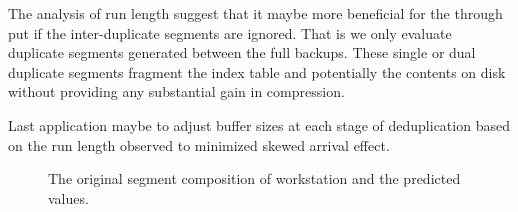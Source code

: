 The analysis of run length suggest that it maybe more beneficial for the through put if the inter-duplicate segments are ignored. That is we only evaluate duplicate segments generated between the full backups. These single or dual duplicate segments fragment the index table and potentially the contents on disk without providing any substantial gain in compression. 

Last application maybe to adjust buffer sizes at each stage of deduplication based on the run length observed to minimized skewed arrival effect. 

 \begin{figure}[!t]
\centerline{
\hfil
{}
}
\caption{The original segment composition of workstation and the predicted values.}
\label{pred}
\end{figure}

